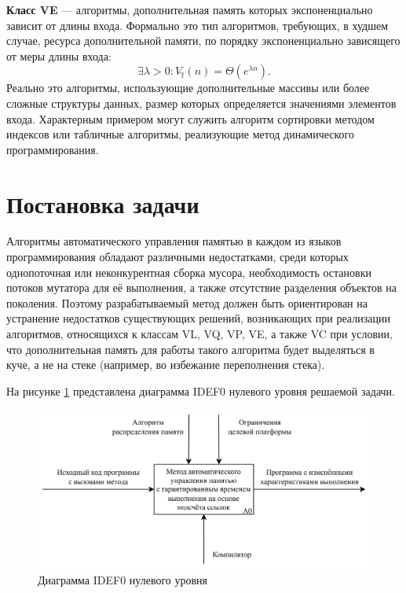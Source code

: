 \textbf{Класс VE} --- алгоритмы, дополнительная память которых экспоненциально зависит от длины входа. Формально это тип алгоритмов, требующих, в худшем случае, ресурса дополнительной памяти, по порядку экспоненциально зависящего от меры длины входа:
\begin{equation}
	\exists \lambda > 0: V\hat{_t}(n) = \Theta(e^{\lambda n}).
\end{equation}
Реально это алгоритмы, использующие дополнительные массивы или более сложные структуры данных, размер которых определяется значениями элементов входа. Характерным примером могут служить алгоритм сортировки методом индексов или табличные алгоритмы, реализующие метод динамического программирования.~\cite{uljanov}


\section{Постановка задачи}

Алгоритмы автоматического управления памятью в каждом из языков программирования обладают различными недостатками, среди которых однопоточная или неконкурентная сборка мусора, необходимость остановки потоков мутатора для её выполнения, а также отсутствие разделения объектов на поколения. Поэтому разрабатываемый метод должен быть ориентирован на устранение недостатков существующих решений, возникающих при реализации алгоритмов, относящихся к классам VL, VQ, VP, VE, а также VC при условии, что дополнительная память для работы такого алгоритма будет выделяться в куче, а не на стеке (например, во избежание переполнения стека).

На рисунке \ref{fig:idef0} представлена диаграмма IDEF0 нулевого уровня решаемой задачи.

\begin{figure}[H]
	\centering
	\includegraphics[width=\textwidth]{assets/idef0.png}
	\caption{Диаграмма IDEF0 нулевого уровня}
	\label{fig:idef0}
\end{figure}

